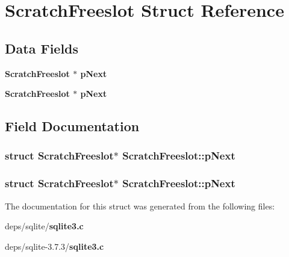 \section{Scratch\-Freeslot Struct Reference}
\label{structScratchFreeslot}
\subsection*{Data Fields}
\begin{CompactItemize}
\item 
\bf{Scratch\-Freeslot} $\ast$ \bf{p\-Next}
\item 
\bf{Scratch\-Freeslot} $\ast$ \bf{p\-Next}
\end{CompactItemize}


\subsection{Field Documentation}
\subsubsection{\setlength{\rightskip}{0pt plus 5cm}struct \bf{Scratch\-Freeslot}$\ast$ \bf{Scratch\-Freeslot::p\-Next}}\label{structScratchFreeslot_9ca04ed251d99655fabedffed6d17b76}


\subsubsection{\setlength{\rightskip}{0pt plus 5cm}struct \bf{Scratch\-Freeslot}$\ast$ \bf{Scratch\-Freeslot::p\-Next}}\label{structScratchFreeslot_9ca04ed251d99655fabedffed6d17b76}




The documentation for this struct was generated from the following files:\begin{CompactItemize}
\item 
deps/sqlite/\bf{sqlite3.c}\item 
deps/sqlite-3.7.3/\bf{sqlite3.c}\end{CompactItemize}

